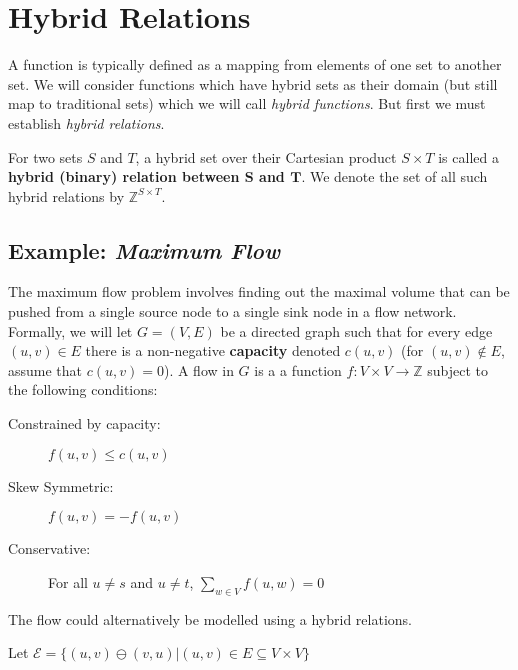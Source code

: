 %
%
\section{Hybrid Relations}


A function is typically defined as a mapping from elements of one set to another set.
We will consider functions which have hybrid sets as their domain (but still map to traditional sets) 
which we will call \emph{hybrid functions}.
But first we must establish \emph{hybrid relations}.

\begin{definition}
	For two sets $S$ and $T$, a hybrid set over their Cartesian product $S \times T$ is called a 
	\textbf{hybrid (binary) relation between $\boldsymbol{S}$ and $\boldsymbol{T}$}.
	We denote the set of all such hybrid relations by $\mathbb{Z}^{S \times T}$. 
\end{definition}


\subsection{Example: \emph{Maximum Flow}}

The maximum flow problem involves finding out the maximal volume that can be pushed from a single source node
to a single sink node in a flow network.
Formally, we will let $G=(V,E)$ be a directed graph such that for every edge $(u,v) \in E$ there is a non-negative
\textbf{capacity} denoted $c(u,v)$ (for $(u,v) \notin E$, assume that $c(u,v)=0$).
A flow in $G$ is a a function $f:V \times V \to \mathbb{Z}$ subject to the following conditions:
\begin{description}
	\item[Constrained by capacity:] $f(u,v) \leq c(u,v)$ 
	\item[Skew Symmetric:] $f(u,v)=-f(u,v)$
	\item[Conservative:] For all $u \neq s$ and $u \neq t$, $\sum_{w \in V} f(u,w) = 0$
\end{description}

The flow could alternatively be modelled using a hybrid relations.

Let $\mathcal{E} = \{ (u,v) \ominus (v,u) | (u,v) \in E \subseteq V \times V \}$

